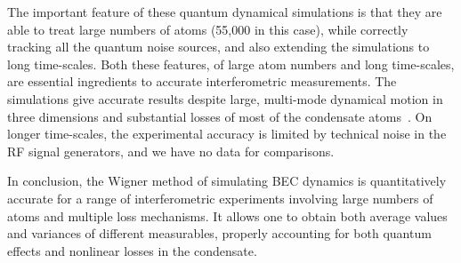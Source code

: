 \documentclass[aps,prl,twocolumn,showpacs,amsmath,amssymb,superscriptaddress]{revtex4-1}
\begin{document}
The important feature of these quantum dynamical simulations
is that they are able to treat large numbers of atoms (55,000 in this case),
while correctly tracking all the quantum noise sources, and also extending the simulations to long time-scales.
Both these features, of large atom numbers and long time-scales,
are essential ingredients to accurate interferometric measurements.
The simulations give accurate results despite large, multi-mode dynamical motion in three dimensions
and substantial losses of most of the condensate atoms~\cite{Egorov2010}.
On longer time-scales, the experimental accuracy is limited by technical noise in the RF signal generators,
and we have no data for comparisons.

In conclusion, the Wigner method of simulating BEC dynamics
is quantitatively accurate  for a range of interferometric experiments
involving large numbers of atoms and multiple loss mechanisms.
It allows one to obtain both average values and variances of different measurables,
properly accounting for both quantum effects and nonlinear losses in the condensate.


\end{document}
